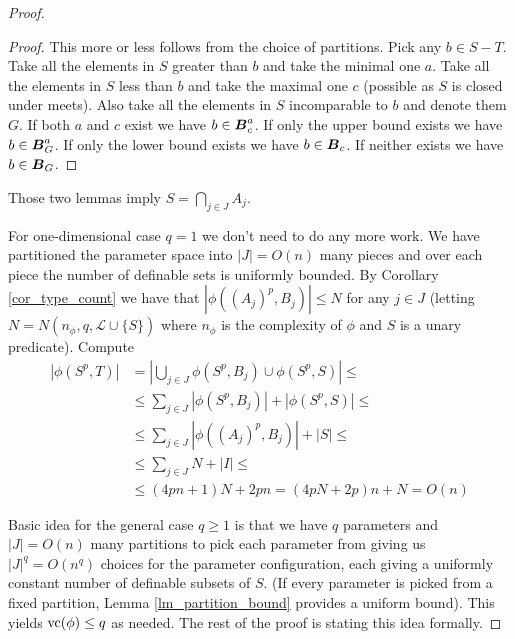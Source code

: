 \documentclass{amsart}
\DeclareMathOperator{\B}{\boldface B}
\renewcommand{\LL}{\mathcal L}
\begin{document}
\begin{proof}
  \begin{proof}
    This more or less follows from the choice of partitions. Pick any $b \in S - T$. Take all the elements in $S$ greater than $b$ and take the minimal one $a$. Take all the elements in $S$ less than $b$ and take the maximal one $c$ (possible as $S$ is closed under meets). Also take all the elements in $S$ incomparable to $b$ and denote them $G$. If both $a$ and $c$ exist we have $b \in \B^a_c$. If only the upper bound exists we have $b \in \B^a_G$. If only the lower bound exists we have $b \in \B_c$. If neither exists we have $b \in \B_G$.
  \end{proof}
  
  \begin{Note}
    Those two lemmas imply $S = \bigcap_{j \in J} A_j$.
  \end{Note}
  
  \begin{Note}
    For one-dimensional case $q = 1$ we don't need to do any more work. We have partitioned the parameter space into $|J| = O(n)$ many pieces and over each piece the number of definable sets is uniformly bounded. By Corollary \ref{cor_type_count} we have that $|\phi((A_j)^p, B_j)| \leq N$ for any $j \in J$ (letting $N = N(n_\phi, q, \LL \cup \{S\})$ where $n_\phi$ is the complexity of $\phi$ and $S$ is a unary predicate). Compute
    \begin{align*}
      |\phi(S^p, T)|
      &= \left|\bigcup_{j \in J} \phi(S^p, B_j) \cup \phi(S^p, S)\right| \leq \\
      &\leq \sum_{j \in J} |\phi(S^p, B_j)| + |\phi(S^p, S)| \leq \\
      &\leq \sum_{j \in J} |\phi((A_j)^p, B_j)| + |S| \leq \\
      &\leq \sum_{j \in J}N + |I| \leq \\
      &\leq (4pn + 1)N + 2pn = (4pN + 2p)n + N = O(n)
    \end{align*}
  \end{Note}
  Basic idea for the general case $q \geq 1$ is that we have $q$ parameters and $|J| = O(n)$ many partitions to pick each parameter from giving us $|J|^q = O(n^q)$ choices for the parameter configuration, each giving a uniformly constant number of definable subsets of $S$. (If every parameter is picked from a fixed partition, Lemma \ref{lm_partition_bound} provides a uniform bound). This yields $\operatorname{vc}(\phi) \leq q$ as needed. The rest of the proof is stating this idea formally.
  

\end{proof}
\end{document}
